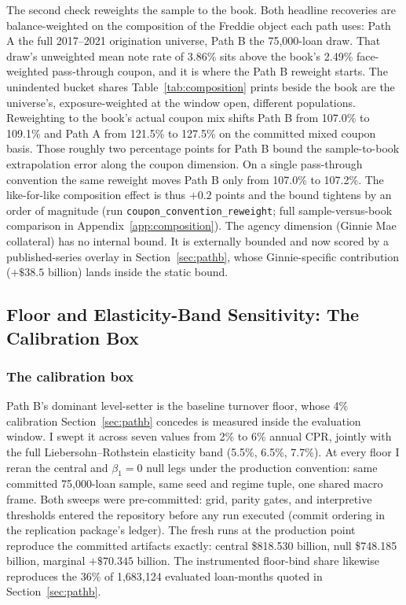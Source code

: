 \documentclass[12pt]{article}
\begin{document}
The second check reweights the sample to the book. Both headline recoveries are balance-weighted on the composition of the Freddie object each path uses: Path A the full 2017--2021 origination universe, Path B the 75,000-loan draw. That draw's unweighted mean note rate of 3.86\% sits above the book's 2.49\% face-weighted pass-through coupon, and it is where the Path B reweight starts. The unindented bucket shares Table~\ref{tab:composition} prints beside the book are the universe's, exposure-weighted at the window open, different populations. Reweighting to the book's actual coupon mix shifts Path B from 107.0\% to 109.1\% and Path A from 121.5\% to 127.5\% on the committed mixed coupon basis. Those roughly two percentage points for Path B bound the sample-to-book extrapolation error along the coupon dimension. On a single pass-through convention the same reweight moves Path B only from 107.0\% to 107.2\%. The like-for-like composition effect is thus $+0.2$ points and the bound tightens by an order of magnitude (run \texttt{coupon\_convention\_reweight}; full sample-versus-book comparison in Appendix~\ref{app:composition}). The agency dimension (Ginnie Mae collateral) has no internal bound. It is externally bounded and now scored by a published-series overlay in Section~\ref{sec:pathb}, whose Ginnie-specific contribution ($+\$38.5$ billion) lands inside the static bound.

\subsection{Floor and Elasticity-Band Sensitivity: The Calibration Box}\label{sec:robustness-floor}

\subsubsection{The calibration box}

Path B's dominant level-setter is the baseline turnover floor, whose 4\% calibration Section~\ref{sec:pathb} concedes is measured inside the evaluation window. I swept it across seven values from 2\% to 6\% annual CPR, jointly with the full Liebersohn--Rothstein elasticity band (5.5\%, 6.5\%, 7.7\%). At every floor I reran the central and $\beta_1 = 0$ null legs under the production convention: same committed 75,000-loan sample, same seed and regime tuple, one shared macro frame. Both sweeps were pre-committed: grid, parity gates, and interpretive thresholds entered the repository before any run executed (commit ordering in the replication package's ledger). The fresh runs at the production point reproduce the committed artifacts exactly: central \$818.530 billion, null \$748.185 billion, marginal $+\$70.345$ billion. The instrumented floor-bind share likewise reproduces the 36\% of 1,683,124 evaluated loan-months quoted in Section~\ref{sec:pathb}.
\end{document}
